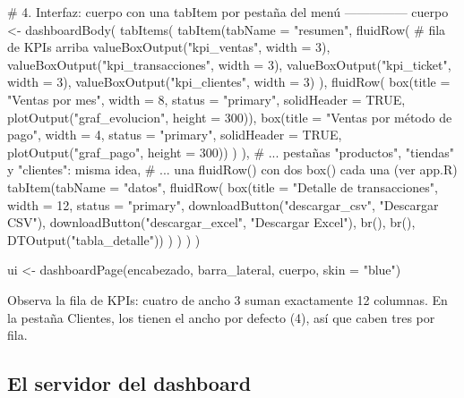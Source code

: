 \begin{rnoejecutar}[title={app.R (parte 4): cuerpo (extracto)}]
# 4. Interfaz: cuerpo con una tabItem por pestaña del menú ---------------
cuerpo <- dashboardBody(
  tabItems(
    tabItem(tabName = "resumen",
      fluidRow(                                   # fila de KPIs arriba
        valueBoxOutput("kpi_ventas", width = 3),
        valueBoxOutput("kpi_transacciones", width = 3),
        valueBoxOutput("kpi_ticket", width = 3),
        valueBoxOutput("kpi_clientes", width = 3)
      ),
      fluidRow(
        box(title = "Ventas por mes", width = 8, status = "primary",
            solidHeader = TRUE, plotOutput("graf_evolucion", height = 300)),
        box(title = "Ventas por método de pago", width = 4,
            status = "primary", solidHeader = TRUE,
            plotOutput("graf_pago", height = 300))
      )
    ),
    # ... pestañas "productos", "tiendas" y "clientes": misma idea,
    # ... una fluidRow() con dos box() cada una (ver app.R)
    tabItem(tabName = "datos",
      fluidRow(
        box(title = "Detalle de transacciones", width = 12,
            status = "primary",
            downloadButton("descargar_csv", "Descargar CSV"),
            downloadButton("descargar_excel", "Descargar Excel"),
            br(), br(),
            DTOutput("tabla_detalle"))
      )
    )
  )
)

ui <- dashboardPage(encabezado, barra_lateral, cuerpo, skin = "blue")
\end{rnoejecutar}

Observa la fila de KPIs: cuatro  de ancho 3 suman
exactamente 12 columnas. En la pestaña Clientes, los 
tienen el ancho por defecto (4), así que caben tres por fila.

\subsection{El servidor del dashboard}

